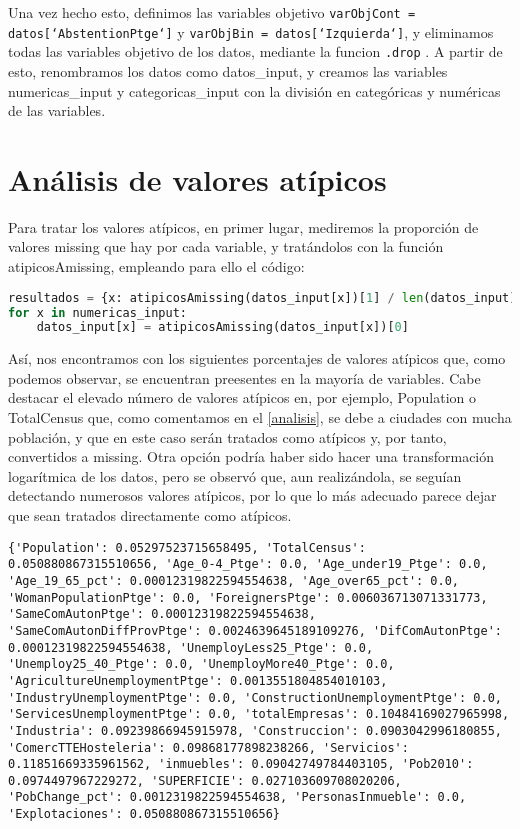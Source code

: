 \documentclass[a4paper,onecolumn]{extarticle}
\begin{document}
\begin{sloppypar}
Una vez hecho esto, definimos las variables objetivo \texttt{varObjCont = datos[`AbstentionPtge`]} y \texttt{varObjBin = datos[`Izquierda`]}, y eliminamos
todas las variables objetivo de los datos, mediante la funcion \texttt{.drop} . A partir de esto, renombramos los datos como datos\_input, y creamos las 
variables numericas\_input y categoricas\_input con la división en categóricas y numéricas de las variables.

\section{Análisis de valores atípicos}\label{atipicos}
Para tratar los valores atípicos, en primer lugar, mediremos la proporción de valores missing que hay por cada variable, y tratándolos con la función 
atipicosAmissing, empleando para ello el código:
\begin{lstlisting}[language=Python]
resultados = {x: atipicosAmissing(datos_input[x])[1] / len(datos_input) for x in numericas_input}
for x in numericas_input:
    datos_input[x] = atipicosAmissing(datos_input[x])[0]
\end{lstlisting}
Así, nos encontramos con los siguientes porcentajes de valores atípicos que, como podemos observar, se encuentran preesentes en la mayoría de variables. Cabe 
destacar el elevado número de valores atípicos en, por ejemplo, Population o TotalCensus que, como comentamos en el \ref{analisis}, se debe a ciudades con 
mucha población, y que en este caso serán tratados como atípicos y, por tanto, convertidos a missing. Otra opción podría haber sido hacer una transformación 
logarítmica de los datos, pero se observó que, aun realizándola, se seguían detectando numerosos valores atípicos, por lo que lo más adecuado parece dejar
que sean tratados directamente como atípicos.
\begin{lstlisting}[numbers=none]
{'Population': 0.05297523715658495, 'TotalCensus': 0.050880867315510656, 'Age_0-4_Ptge': 0.0, 'Age_under19_Ptge': 0.0, 'Age_19_65_pct': 0.00012319822594554638, 'Age_over65_pct': 0.0, 'WomanPopulationPtge': 0.0, 'ForeignersPtge': 0.006036713071331773, 'SameComAutonPtge': 0.00012319822594554638, 'SameComAutonDiffProvPtge': 0.0024639645189109276, 'DifComAutonPtge': 0.00012319822594554638, 'UnemployLess25_Ptge': 0.0, 'Unemploy25_40_Ptge': 0.0, 'UnemployMore40_Ptge': 0.0, 'AgricultureUnemploymentPtge': 0.0013551804854010103, 'IndustryUnemploymentPtge': 0.0, 'ConstructionUnemploymentPtge': 0.0, 'ServicesUnemploymentPtge': 0.0, 'totalEmpresas': 0.10484169027965998, 'Industria': 0.09239866945915978, 'Construccion': 0.0903042996180855, 'ComercTTEHosteleria': 0.09868177898238266, 'Servicios': 0.11851669335961562, 'inmuebles': 0.09042749784403105, 'Pob2010': 0.0974497967229272, 'SUPERFICIE': 0.027103609708020206, 'PobChange_pct': 0.0012319822594554638, 'PersonasInmueble': 0.0, 'Explotaciones': 0.050880867315510656}
\end{lstlisting}


\end{sloppypar}
\end{document}
